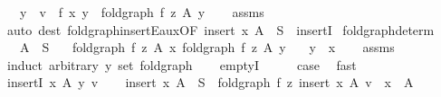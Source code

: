 \begin{isabellebody}
\ \ \ y\ \ {\isachardoublequoteopen}v\ {\isacharequal}{\kern0pt}\ f\ x\ y{\isachardoublequoteclose}\ \ {\isachardoublequoteopen}fold{\isacharunderscore}{\kern0pt}graph\ f\ z\ A\ y{\isachardoublequoteclose}\isanewline
%
\isadelimproof
\ \ %
\endisadelimproof
%
\isatagproof
{}\isamarkupfalse%
\ assms\ \isamarkupfalse%
\ {\isacharparenleft}{\kern0pt}auto\ dest{\isacharcolon}{\kern0pt}\ fold{\isacharunderscore}{\kern0pt}graph{\isacharunderscore}{\kern0pt}insertE{\isacharunderscore}{\kern0pt}aux{\isacharbrackleft}{\kern0pt}OF\ {\isacartoucheopen}insert\ x\ A\ {\isasymsubseteq}\ S{\isacartoucheclose}\ {\isacharunderscore}{\kern0pt}\ insertI{}{\isacharbrackright}{\kern0pt}{\isacharparenright}{\kern0pt}%
\endisatagproof
{\isafoldproof}%
%
\isadelimproof
\isanewline
%
\endisadelimproof
\isanewline
{}\isamarkupfalse%
\ fold{\isacharunderscore}{\kern0pt}graph{\isacharunderscore}{\kern0pt}determ{\isacharcolon}{\kern0pt}\isanewline
\ \ \ {\isachardoublequoteopen}A\ {\isasymsubseteq}\ S{\isachardoublequoteclose}\isanewline
\ \ \ {\isachardoublequoteopen}fold{\isacharunderscore}{\kern0pt}graph\ f\ z\ A\ x{\isachardoublequoteclose}\ {\isachardoublequoteopen}fold{\isacharunderscore}{\kern0pt}graph\ f\ z\ A\ y{\isachardoublequoteclose}\isanewline
\ \ \ {\isachardoublequoteopen}y\ {\isacharequal}{\kern0pt}\ x{\isachardoublequoteclose}\isanewline
%
\isadelimproof
\ \ %
\endisadelimproof
%
\isatagproof
{}\isamarkupfalse%
\ assms{\isacharparenleft}{\kern0pt}{}{\isacharminus}{\kern0pt}{\isacharcomma}{\kern0pt}{}{\isacharparenright}{\kern0pt}\isanewline
{}\isamarkupfalse%
\ {\isacharparenleft}{\kern0pt}induct\ arbitrary{\isacharcolon}{\kern0pt}\ y\ set{\isacharcolon}{\kern0pt}\ fold{\isacharunderscore}{\kern0pt}graph{\isacharparenright}{\kern0pt}\isanewline
\ \ \isamarkupfalse%
\ emptyI\isanewline
\ \ \isamarkupfalse%
\ \isamarkupfalse%
\ {\isacharquery}{\kern0pt}case\ \isamarkupfalse%
\ fast\isanewline
{}\isamarkupfalse%
\isanewline
\ \ \isamarkupfalse%
\ {\isacharparenleft}{\kern0pt}insertI\ x\ A\ y\ v{\isacharparenright}{\kern0pt}\isanewline
\ \ \isamarkupfalse%
\ {\isacartoucheopen}insert\ x\ A\ {\isasymsubseteq}\ S{\isacartoucheclose}\ \ {\isacartoucheopen}fold{\isacharunderscore}{\kern0pt}graph\ f\ z\ {\isacharparenleft}{\kern0pt}insert\ x\ A{\isacharparenright}{\kern0pt}\ v{\isacartoucheclose}\ \ {\isacartoucheopen}x\ {\isasymnotin}\ A{\isacartoucheclose}\isanewline

\end{isabellebody}
